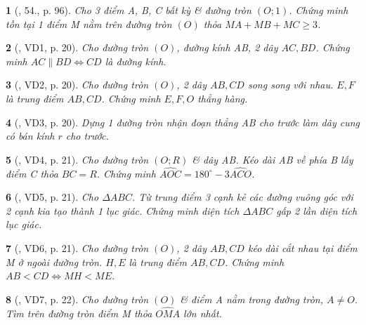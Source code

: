 \documentclass{article}
\newtheorem{baitoan}{}
\begin{document}
\begin{baitoan}[\cite{Binh_Toan_9_tap_1}, 54., p. 96]
	Cho 3 điểm A, B, C bất kỳ \& đường tròn $(O;1)$. Chứng minh tồn tại 1 điểm M nằm trên đường tròn $(O)$ thỏa $MA + MB + MC\ge3$.
\end{baitoan}

\begin{baitoan}[\cite{TLCT_THCS_Toan_9_hinh_hoc}, VD1, p. 20]
	Cho đường tròn $(O)$, đường kính AB, 2 dây $AC,BD$. Chứng minh $AC\parallel BD\Leftrightarrow CD$ là đường kính.
\end{baitoan}

\begin{baitoan}[\cite{TLCT_THCS_Toan_9_hinh_hoc}, VD2, p. 20]
	Cho đường tròn $(O)$, 2 dây $AB,CD$ song song với nhau. $E,F$ là trung điểm $AB,CD$. Chứng minh $E,F,O$ thẳng hàng.
\end{baitoan}

\begin{baitoan}[\cite{TLCT_THCS_Toan_9_hinh_hoc}, VD3, p. 20]
	Dựng 1 đường tròn nhận đoạn thẳng AB cho trước làm dây cung có bán kính $r$ cho trước.
\end{baitoan}

\begin{baitoan}[\cite{TLCT_THCS_Toan_9_hinh_hoc}, VD4, p. 21]
	Cho đường tròn $(O;R)$ \& dây AB. Kéo dài AB về phía B lấy điểm C thỏa $BC = R$. Chứng minh $\widehat{AOC} = 180^\circ - 3\widehat{ACO}$.
\end{baitoan}

\begin{baitoan}[\cite{TLCT_THCS_Toan_9_hinh_hoc}, VD5, p. 21]
	Cho $\Delta ABC$. Từ trung điểm 3 cạnh kẻ các đường vuông góc với 2 cạnh kia tạo thành 1 lục giác. Chứng minh diện tích $\Delta ABC$ gấp 2 lần diện tích lục giác.
\end{baitoan}

\begin{baitoan}[\cite{TLCT_THCS_Toan_9_hinh_hoc}, VD6, p. 21]
	Cho đường tròn $(O)$, 2 dây $AB,CD$ kéo dài cắt nhau tại điểm M ở ngoài đường tròn. $H,E$ là trung điểm $AB,CD$. Chứng minh $AB < CD\Leftrightarrow MH < ME$.
\end{baitoan}

\begin{baitoan}[\cite{TLCT_THCS_Toan_9_hinh_hoc}, VD7, p. 22]
	Cho đường tròn $(O)$ \& điểm A nằm trong đường tròn, $A\ne O$. Tìm trên đường tròn điểm M thỏa $\widehat{OMA}$ lớn nhất.
\end{baitoan}
\end{document}
